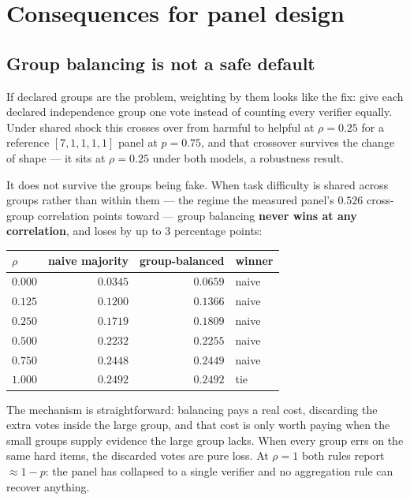 \documentclass[11pt,a4paper]{article}
\begin{document}
\section{Consequences for panel design}
\label{sec:consequences}

\subsection{Group balancing is not a safe default}

If declared groups are the problem, weighting by them looks like the fix: give
each declared independence group one vote instead of counting every verifier
equally. Under shared shock this crosses over from harmful to helpful at
$\rho = 0.25$ for a reference $[7,1,1,1,1]$ panel at $p = 0.75$, and that
crossover survives the change of shape --- it sits at $\rho = 0.25$ under both
models, a robustness result.

It does not survive the groups being fake. When task difficulty is shared across
groups rather than within them --- the regime the measured panel's
$0.526$ cross-group correlation points toward --- group balancing \textbf{never
wins at any correlation}, and loses by up to 3 percentage points:

\begin{center}
\begin{tabular}{lrrl}
\toprule
$\rho$ & naive majority & group-balanced & winner \\
\midrule
$0.000$ & $\mathbf{0.0345}$ & $0.0659$ & naive \\
$0.125$ & $\mathbf{0.1200}$ & $0.1366$ & naive \\
$0.250$ & $\mathbf{0.1719}$ & $0.1809$ & naive \\
$0.500$ & $\mathbf{0.2232}$ & $0.2255$ & naive \\
$0.750$ & $\mathbf{0.2448}$ & $0.2449$ & naive \\
$1.000$ & $0.2492$ & $0.2492$ & tie \\
\bottomrule
\end{tabular}
\end{center}

The mechanism is straightforward: balancing pays a real cost, discarding the
extra votes inside the large group, and that cost is only worth paying when the
small groups supply evidence the large group lacks. When every group errs on the
same hard items, the discarded votes are pure loss. At $\rho = 1$ both rules
report $\approx 1 - p$: the panel has collapsed to a single verifier and no
aggregation rule can recover anything.
\end{document}
